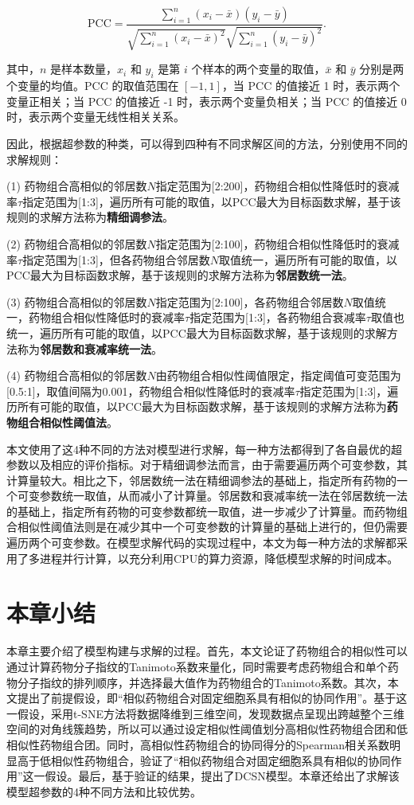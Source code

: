 \begin{equation*}
\text{PCC} = \frac{\sum_{i=1}^{n}(x_i - \bar{x})(y_i - \bar{y})}{\sqrt{\sum_{i=1}^{n}(x_i - \bar{x})^2}\sqrt{\sum_{i=1}^{n}(y_i - \bar{y})^2}}.
\end{equation*}

\noindent 其中，$n$ 是样本数量，$x_i$ 和 $y_i$ 是第 $i$ 个样本的两个变量的取值，$\bar{x}$ 和 $\bar{y}$ 分别是两个变量的均值。PCC 的取值范围在 $[-1, 1]$，当 PCC 的值接近 1 时，表示两个变量正相关；当 PCC 的值接近 -1 时，表示两个变量负相关；当 PCC 的值接近 0 时，表示两个变量无线性相关关系。

因此，根据超参数的种类，可以得到四种有不同求解区间的方法，分别使用不同的求解规则：

(1) 药物组合高相似的邻居数$N$指定范围为[2:200]，药物组合相似性降低时的衰减率$τ$指定范围为[1:3]，遍历所有可能的取值，以PCC最大为目标函数求解，基于该规则的求解方法称为\textbf{精细调参法}。

(2)	药物组合高相似的邻居数$N$指定范围为[2:100]，药物组合相似性降低时的衰减率$τ$指定范围为[1:3]，但各药物组合邻居数$N$取值统一，遍历所有可能的取值，以PCC最大为目标函数求解，基于该规则的求解方法称为\textbf{邻居数统一法}。

(3)	药物组合高相似的邻居数$N$指定范围为[2:100]，各药物组合邻居数$N$取值统一，药物组合相似性降低时的衰减率$τ$指定范围为[1:3]，各药物组合衰减率$τ$取值也统一，遍历所有可能的取值，以PCC最大为目标函数求解，基于该规则的求解方法称为\textbf{邻居数和衰减率统一法}。

(4)	药物组合高相似的邻居数$N$由药物组合相似性阈值限定，指定阈值可变范围为[0.5:1]，取值间隔为0.001，药物组合相似性降低时的衰减率$τ$指定范围为[1:3]，遍历所有可能的取值，以PCC最大为目标函数求解，基于该规则的求解方法称为\textbf{药物组合相似性阈值法}。

本文使用了这4种不同的方法对模型进行求解，每一种方法都得到了各自最优的超参数以及相应的评价指标。对于精细调参法而言，由于需要遍历两个可变参数，其计算量较大。相比之下，邻居数统一法在精细调参法的基础上，指定所有药物的一个可变参数统一取值，从而减小了计算量。邻居数和衰减率统一法在邻居数统一法的基础上，指定所有药物的可变参数都统一取值，进一步减少了计算量。而药物组合相似性阈值法则是在减少其中一个可变参数的计算量的基础上进行的，但仍需要遍历两个可变参数。在模型求解代码的实现过程中，本文为每一种方法的求解都采用了多进程并行计算，以充分利用CPU的算力资源，降低模型求解的时间成本。

\section{本章小结}

本章主要介绍了模型构建与求解的过程。首先，本文论证了药物组合的相似性可以通过计算药物分子指纹的Tanimoto系数来量化，同时需要考虑药物组合和单个药物分子指纹的排列顺序，并选择最大值作为药物组合的Tanimoto系数。其次，本文提出了前提假设，即“相似药物组合对固定细胞系具有相似的协同作用”。基于这一假设，采用t-SNE方法将数据降维到三维空间，发现数据点呈现出跨越整个三维空间的对角线簇趋势，所以可以通过设定相似性阈值划分高相似性药物组合团和低相似性药物组合团。同时，高相似性药物组合的协同得分的Spearman相关系数明显高于低相似性药物组合，验证了“相似药物组合对固定细胞系具有相似的协同作用”这一假设。最后，基于验证的结果，提出了DCSN模型。本章还给出了求解该模型超参数的4种不同方法和比较优势。